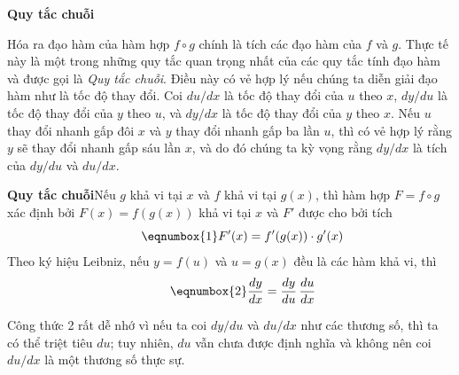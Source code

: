 \begin{minipage}[t]{0.71\textwidth}
    \noindent{\color{stewartcyan}\rule{1.2ex}{1.2ex}}\hspace{0.5em}\textbf{\textsf{\Large Quy tắc chuỗi}}\par\vspace{0.6em}

    \noindent
    Hóa ra đạo hàm của hàm hợp $f \circ g$ chính là tích các đạo hàm của $f$ và $g$. Thực tế này là một trong những quy tắc quan trọng nhất của các quy tắc tính đạo hàm và được gọi là \emph{Quy tắc chuỗi}. Điều này có vẻ hợp lý nếu chúng ta diễn giải đạo hàm như là tốc độ thay đổi. Coi $du/dx$ là tốc độ thay đổi của $u$ theo $x$, $dy/du$ là tốc độ thay đổi của $y$ theo $u$, và $dy/dx$ là tốc độ thay đổi của $y$ theo $x$. Nếu $u$ thay đổi nhanh gấp đôi $x$ và $y$ thay đổi nhanh gấp ba lần $u$, thì có vẻ hợp lý rằng $y$ sẽ thay đổi nhanh gấp sáu lần $x$, và do đó chúng ta kỳ vọng rằng $dy/dx$ là tích của $dy/du$ và $du/dx$.

    \vspace{0.6em}
    \begin{definitionbox}
        \noindent
        \textbf{\textsf{\color{stewartred}Quy tắc chuỗi}}\quad Nếu $g$ khả vi tại $x$ và $f$ khả vi tại $g(x)$, thì hàm hợp $F = f \circ g$ xác định bởi $F(x) = f(g(x))$ khả vi tại $x$ và $F'$ được cho bởi tích
        \begin{equation}
            \tag*{\eqnumbox{1}}
            F'(x) = f'(g(x)) \cdot g'(x)
        \end{equation}
        Theo ký hiệu Leibniz, nếu $y = f(u)$ và $u = g(x)$ đều là các hàm khả vi, thì
        \begin{equation}
            \tag*{\eqnumbox{2}}
            \frac{dy}{dx} = \frac{dy}{du}\,\frac{du}{dx}
        \end{equation}
    \end{definitionbox}

    \vspace{0.6em}
    Công thức 2 rất dễ nhớ vì nếu ta coi $dy/du$ và $du/dx$ như các thương số, thì ta có thể triệt tiêu $du$; tuy nhiên, $du$ vẫn chưa được định nghĩa và không nên coi $du/dx$ là một thương số thực sự.


\end{minipage}
